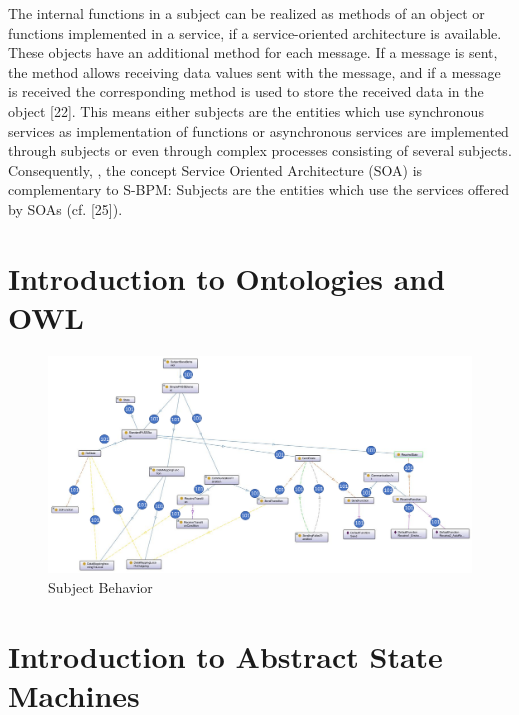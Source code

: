 The internal functions in a subject can be realized as methods of an object or functions implemented in a service, if a service-oriented architecture is available. These objects have an additional method for each message. If a message is sent, the method allows receiving data values sent with the message, and if a message is received the corresponding method is used to store the received data in the object [22]. This means either subjects are the entities which use synchronous services as implementation of functions or asynchronous services are implemented through subjects or even through complex processes consisting of several subjects. Consequently, , the concept Service Oriented Architecture (SOA) is complementary to S-BPM: Subjects are the entities which use the services offered by SOAs (cf. [25]).



\section{Introduction to Ontologies and OWL }


\begin{landscape}


\begin{figure}[ph]
	\centering
	\includegraphics[width=1.0\linewidth]{20181026-Ontologie-Bilder/Grafiken-Ontologie/SUbjectExecution/20181218-SubjectBehavior}
	\caption[Subject Behavior]{Subject Behavior}
	\label{fig:20181218-subjectbehavior}
\end{figure}
\end{landscape}

\section{Introduction to Abstract State Machines }